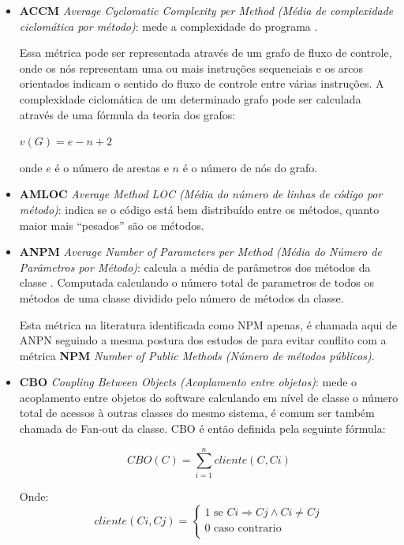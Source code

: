 \begin{itemize}
  \item {\bf ACCM} {\it Average Cyclomatic Complexity per Method (Média de
    complexidade ciclomática por método)}: mede a complexidade do programa
    \cite{McCabe1976}.

Essa métrica pode ser representada através de um grafo de fluxo de controle,
onde os nós representam uma ou mais instruções sequenciais e os arcos
orientados indicam o sentido do fluxo de controle entre várias instruções. A
complexidade ciclomática de um determinado grafo pode ser calculada através de
uma fórmula da teoria dos grafos:

$ v(G) = e − n + 2 $

onde $e$ é o número de arestas e $n$ é o número de nós do grafo.


  \item {\bf AMLOC} {\it Average Method LOC (Média do número de linhas de
    código por método)}: indica se o código está bem distribuído entre os
    métodos, quanto maior mais ``pesados'' são os métodos.

  \item {\bf ANPM} {\it Average Number of Parameters per Method (Média do
    Número de Parâmetros por Método)}: calcula a média de parâmetros dos
    métodos da classe \cite{Jagdish1997}. Computada calculando o número
    total de parametros de todos os métodos de uma classe dividido pelo número
    de métodos da classe.

    Esta métrica na literatura identificada como NPM apenas, é chamada aqui
    de ANPN seguindo a mesma postura dos estudos de \cite{Meirelles2013} para
    evitar conflito com a métrica {\bf NPM} {\it Number of Public Methods
    (Número de métodos públicos)}.

  \item {\bf CBO} {\it Coupling Between Objects (Acoplamento entre objetos)}:
    mede o acoplamento entre objetos do software \cite{Chidamber1994}
    calculando em nível de classe o número total de acessos à outras classes do
    mesmo sistema, é comum ser também chamada de Fan-out da classe. CBO é então
    definida pela seguinte fórmula:

\[ CBO(C) = \sum_{i=1}^{n} cliente(C, Ci) \]

Onde:
\[ cliente(Ci, Cj) =
  \begin{cases}
    1 \text{ se } Ci \Rightarrow Cj \wedge Ci \neq Cj \\
    0 \text{ caso contrario} \\
  \end{cases}
\]


\end{itemize}
